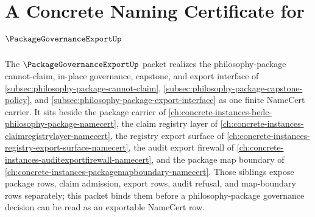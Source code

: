 \chapter{A Concrete Naming Certificate for $\PackageGovernanceExportUp$}
\label{ch:concrete-instances-package-governance-export-namecert}

The $\PackageGovernanceExportUp$ packet realizes the philosophy-package cannot-claim, in-place governance, capstone, and export interface of \autoref{subsec:philosophy-package-cannot-claim}, \autoref{subsec:philosophy-package-capstone-policy}, and \autoref{subsec:philosophy-package-export-interface} as one finite NameCert carrier. It sits beside the package carrier of \autoref{ch:concrete-instances-bedc-philosophy-package-namecert}, the claim registry layer of \autoref{ch:concrete-instances-claimregistrylayer-namecert}, the registry export surface of \autoref{ch:concrete-instances-registry-export-surface-namecert}, the audit export firewall of \autoref{ch:concrete-instances-auditexportfirewall-namecert}, and the package map boundary of \autoref{ch:concrete-instances-packagemapboundary-namecert}. Those siblings expose package rows, claim admission, export rows, audit refusal, and map-boundary rows separately; this packet binds them before a philosophy-package governance decision can be read as an exportable NameCert row.

